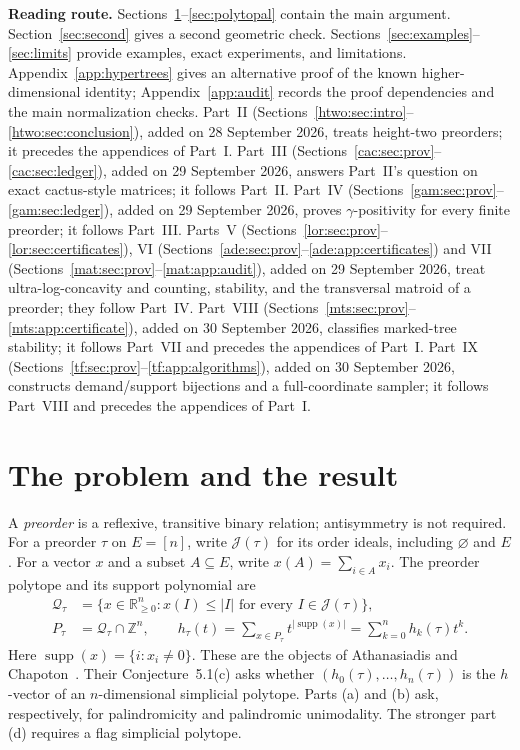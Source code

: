 \documentclass[11pt]{article}
\numberwithin{equation}{section}
\theoremstyle{definition}
\newcommand{\R}{\mathbb R}
\newcommand{\Z}{\mathbb Z}
\newcommand{\J}{\mathcal J(\tau)}
\newcommand{\Qt}{\mathcal Q_\tau}
\newcommand{\Pt}{P_\tau}
\newcommand{\supp}{\operatorname{supp}}
\begin{document}
\begin{tcolorbox}[colback=Pale,colframe=Pale,arc=1mm]
\small\textbf{Reading route.} Sections~\ref{sec:problem}--\ref{sec:polytopal}
contain the main argument. Section~\ref{sec:second} gives a second geometric
check. Sections~\ref{sec:examples}--\ref{sec:limits} provide examples, exact
experiments, and limitations. Appendix~\ref{app:hypertrees} gives an alternative
proof of the known higher-dimensional identity; Appendix~\ref{app:audit}
records the proof dependencies and the main normalization checks.
Part~II (Sections~\ref{htwo:sec:intro}--\ref{htwo:sec:conclusion}), added
on 28 September 2026, treats height-two preorders; it precedes the
appendices of Part~I. Part~III
(Sections~\ref{cac:sec:prov}--\ref{cac:sec:ledger}), added on
29 September 2026, answers Part~II's question on exact cactus-style
matrices; it follows Part~II. Part~IV
(Sections~\ref{gam:sec:prov}--\ref{gam:sec:ledger}), added on
29 September 2026, proves $\gamma$-positivity for every finite preorder; it
follows Part~III. Parts~V (Sections~\ref{lor:sec:prov}--\ref{lor:sec:certificates}),
VI (Sections~\ref{ade:sec:prov}--\ref{ade:app:certificates}) and VII
(Sections~\ref{mat:sec:prov}--\ref{mat:app:audit}), added on
29 September 2026, treat ultra-log-concavity and counting, stability, and
the transversal matroid of a preorder; they follow Part~IV.
Part~VIII (Sections~\ref{mts:sec:prov}--\ref{mts:app:certificate}), added
on 30 September 2026, classifies marked-tree stability; it follows
Part~VII and precedes the appendices of Part~I.
Part~IX (Sections~\ref{tf:sec:prov}--\ref{tf:app:algorithms}), added
on 30 September 2026, constructs demand/support bijections and a
full-coordinate sampler; it follows Part~VIII and precedes the appendices
of Part~I.
\end{tcolorbox}
\newpage
{}

\section{The problem and the result}\label{sec:problem}

A \emph{preorder} is a reflexive, transitive binary relation; antisymmetry is not
required. For a preorder $\tau$ on $E=[n]$, write $\J$ for its order ideals,
including $\varnothing$ and $E$. For a vector $x$ and a subset $A\subseteq E$,
write $x(A)=\sum_{i\in A}x_i$. The preorder polytope and its support polynomial
are
\begin{align}
 \Qt&=\{x\in\R_{\geq0}^{n}:x(I)\leq |I|\text{ for every }I\in\J\},
 \label{eq:Q}\tag{1.1}\\
 \Pt&=\Qt\cap\Z^n,\qquad
 h_\tau(t)=\sum_{x\in\Pt}t^{|\supp(x)|}
          =\sum_{k=0}^{n}h_k(\tau)t^k.\label{eq:h}
\end{align}
Here $\supp(x)=\{i:x_i\ne0\}$. These are the objects of
Athanasiadis and Chapoton~\cite{AC}. Their Conjecture~5.1(c) asks whether
$(h_0(\tau),\ldots,h_n(\tau))$ is the $h$-vector of an $n$-dimensional
simplicial polytope. Parts (a) and (b) ask, respectively, for palindromicity and
palindromic unimodality. The stronger part (d) requires a flag simplicial
polytope.
\end{document}
